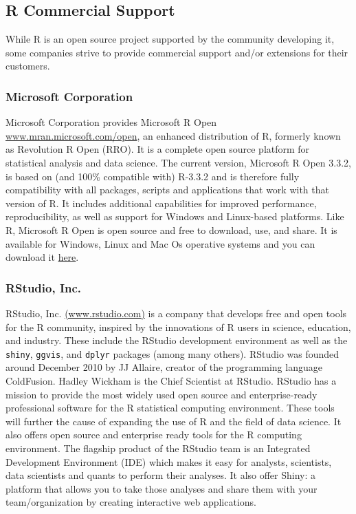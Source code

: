 \documentclass[]{book}
\begin{document}
\subsection{R Commercial Support}\label{r-commercial-support}

While R is an open source project supported by the community developing
it, some companies strive to provide commercial support and/or
extensions for their customers.

\subsubsection{Microsoft Corporation}\label{microsoft-corporation}

Microsoft Corporation provides Microsoft R Open
\href{https://mran.microsoft.com/open/}{www.mran.microsoft.com/open}, an
enhanced distribution of R, formerly known as Revolution R Open (RRO).
It is a complete open source platform for statistical analysis and data
science. The current version, Microsoft R Open 3.3.2, is based on (and
100\% compatible with) R-3.3.2 and is therefore fully compatibility with
all packages, scripts and applications that work with that version of R.
It includes additional capabilities for improved performance,
reproducibility, as well as support for Windows and Linux-based
platforms. Like R, Microsoft R Open is open source and free to download,
use, and share. It is available for Windows, Linux and Mac Os operative
systems and you can download it
\href{https://mran.microsoft.com/download/}{here}.

\subsubsection{RStudio, Inc.}\label{rstudio-inc.}

RStudio, Inc. \href{http://www.rstudio.com/}{(www.rstudio.com)} is a
company that develops free and open tools for the R community, inspired
by the innovations of R users in science, education, and industry. These
include the RStudio development environment as well as the
\texttt{shiny}, \texttt{ggvis}, and \texttt{dplyr} packages (among many
others). RStudio was founded around December 2010 by JJ Allaire, creator
of the programming language ColdFusion. Hadley Wickham is the Chief
Scientist at RStudio. RStudio has a mission to provide the most widely
used open source and enterprise-ready professional software for the R
statistical computing environment. These tools will further the cause of
expanding the use of R and the field of data science. It also offers
open source and enterprise ready tools for the R computing environment.
The flagship product of the RStudio team is an Integrated Development
Environment (IDE) which makes it easy for analysts, scientists, data
scientists and quants to perform their analyses. It also offer Shiny: a
platform that allows you to take those analyses and share them with your
team/organization by creating interactive web applications.
\end{document}
